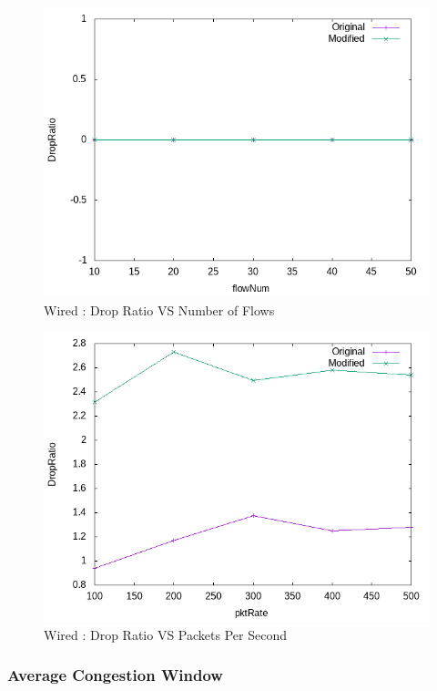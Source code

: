      \begin{figure}[!h]
        \centering
        \includegraphics[width=.9\textwidth]{Pictures/Wired/Combined/DropRatioVSflowNum.png}
        \caption{Wired : Drop Ratio VS Number of Flows}
    \end{figure}
    
    \begin{figure}[!h] 
        \centering
        \includegraphics[width=.9\textwidth]{Pictures/Wired/Combined/DropRatioVSpktRate.png}
        \caption{Wired : Drop Ratio VS Packets Per Second}
    \end{figure}
    
\newpage
\subsubsection{Average Congestion Window}
    
